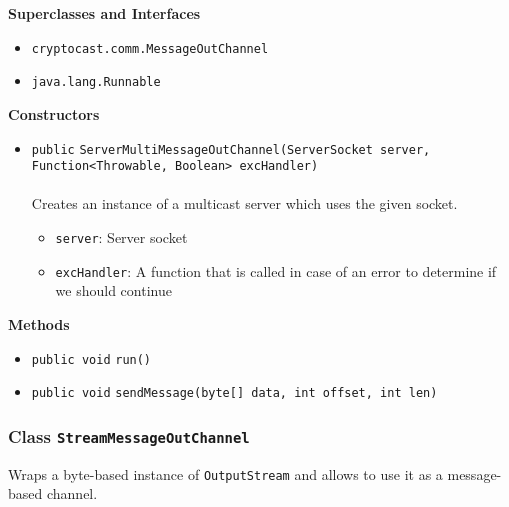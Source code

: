 \textbf{\sffamily Superclasses and Interfaces}
\begin{itemize}
\item \lstinline|cryptocast.comm.MessageOutChannel|
\item \lstinline|java.lang.Runnable|
\end{itemize}


\textbf{\sffamily Constructors}
\begin{itemize}
\item \lstinline|public| \lstinline|ServerMultiMessageOutChannel|\lstinline|(ServerSocket server, Function<Throwable, Boolean> excHandler)|\\ \\[-0.6em]
Creates an instance of a multicast server which uses the given socket.
\begin{itemize}
\item \lstinline|server|: Server socket
\item \lstinline|excHandler|: A function that is called in case of an error to
 determine if we should continue
\end{itemize}



\end{itemize}


\textbf{\sffamily Methods}
\begin{itemize}
\item \lstinline|public void| \lstinline|run|\lstinline|()| \\[-0.6em]




\item \lstinline|public void| \lstinline|sendMessage|\lstinline|(byte[] data, int offset, int len)| \\[-0.6em]




\end{itemize}

\subsubsection{Class \lstinline|StreamMessageOutChannel|}
Wraps a byte-based instance of \lstinline|OutputStream| and allows to use it as a message-based
 channel. \\
\noindent\begin{minipage}[t]{5cm}
\vspace{0.3em}
\hspace*{2em}
\vspace{0.3em}
\end{minipage}



